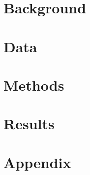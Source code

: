 \documentclass[11pt, english, letterpaper]{article}
\begin{document}
\newpage 

\newpage



\vspace{-5mm} \section*{}
\label{sec:intro}


\section{Background}
\label{sec:background}


\section{Data}
\label{sec:data}


\section{Methods}
\label{sec:methods}


\section{Results}
\label{sec:results}


% 

\newpage

\printbibliography

\setcounter{page}{0}
\setcounter{table}{0}
\setcounter{figure}{0}
\setcounter{section}{0}
\renewcommand{\thetable}{\thesection\arabic{table}}
\renewcommand{\thefigure}{\thesection\arabic{figure}}
\renewcommand{\thepage}{\thesection\arabic{page}}
\renewcommand\thesection{\Alph{section}}
\renewcommand\thesubsection{\thesection.\arabic{subsection}}
\newpage
\section*{Appendix}
\end{document}
